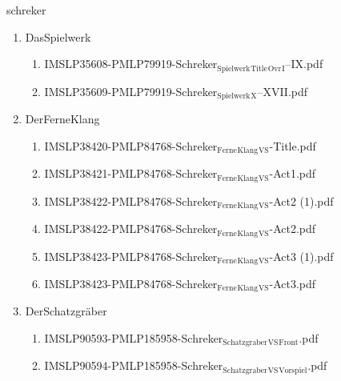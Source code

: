 \documentclass[11pt]{article}
\begin{document}
\item schreker
\label{sec-1-1-1-1-44-59}
\begin{enumerate}
\item DasSpielwerk
\label{sec-1-1-1-1-44-59-1}
\begin{enumerate}
\item IMSLP35608-PMLP79919-Schreker$_{\text{Spielwerk}}$$_{\text{Title}}$$_{\text{Ovr}}$$_{\text{I}}$--IX.pdf
\label{sec-1-1-1-1-44-59-1-1}

\item IMSLP35609-PMLP79919-Schreker$_{\text{Spielwerk}}$$_{\text{X}}$--XVII.pdf
\label{sec-1-1-1-1-44-59-1-2}
\end{enumerate}

\item DerFerneKlang
\label{sec-1-1-1-1-44-59-2}
\begin{enumerate}
\item IMSLP38420-PMLP84768-Schreker$_{\text{Ferne}}$$_{\text{Klang}}$$_{\text{VS}}$-Title.pdf
\label{sec-1-1-1-1-44-59-2-1}

\item IMSLP38421-PMLP84768-Schreker$_{\text{Ferne}}$$_{\text{Klang}}$$_{\text{VS}}$-Act1.pdf
\label{sec-1-1-1-1-44-59-2-2}

\item IMSLP38422-PMLP84768-Schreker$_{\text{Ferne}}$$_{\text{Klang}}$$_{\text{VS}}$-Act2 (1).pdf
\label{sec-1-1-1-1-44-59-2-3}

\item IMSLP38422-PMLP84768-Schreker$_{\text{Ferne}}$$_{\text{Klang}}$$_{\text{VS}}$-Act2.pdf
\label{sec-1-1-1-1-44-59-2-4}

\item IMSLP38423-PMLP84768-Schreker$_{\text{Ferne}}$$_{\text{Klang}}$$_{\text{VS}}$-Act3 (1).pdf
\label{sec-1-1-1-1-44-59-2-5}

\item IMSLP38423-PMLP84768-Schreker$_{\text{Ferne}}$$_{\text{Klang}}$$_{\text{VS}}$-Act3.pdf
\label{sec-1-1-1-1-44-59-2-6}
\end{enumerate}

\item DerSchatzgräber
\label{sec-1-1-1-1-44-59-3}
\begin{enumerate}
\item IMSLP90593-PMLP185958-Schreker$_{\text{Schatzgraber}}$$_{\text{VS}}$$_{\text{Front}}$.pdf
\label{sec-1-1-1-1-44-59-3-1}

\item IMSLP90594-PMLP185958-Schreker$_{\text{Schatzgraber}}$$_{\text{VS}}$$_{\text{Vorspiel}}$.pdf
\label{sec-1-1-1-1-44-59-3-2}


\end{enumerate}
\end{enumerate}
\end{document}
